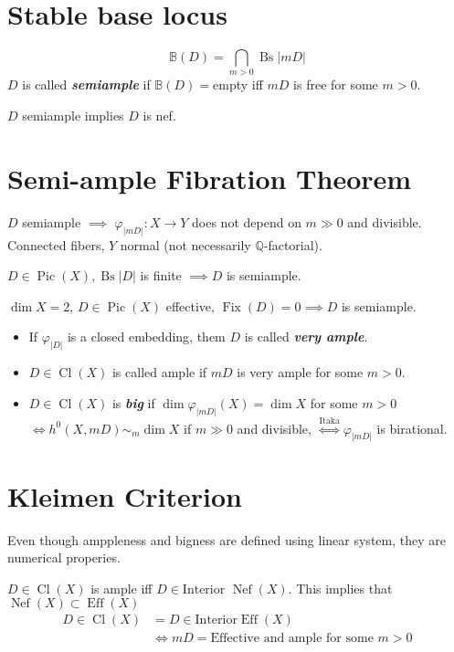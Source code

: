  \section{Stable base locus}
 \[\mathbb{B}(D)=\bigcap_{m>0}\operatorname{Bs}|mD|\]
 $D$ is called \textit{\textbf{semiample}} if  $\mathbb{B}(D)=$empty iff $mD$ is free for some $m>0$.

  $D$ semiample implies $D$ is nef.

 \section{Semi-ample Fibration Theorem}

 \begin{thm}
 	$D$ semiample $\implies $ $\varphi_{|mD|}:X\to Y$ does not depend on $m\gg 0$ and divisible. Connected fibers,  $Y$ normal (not necessarily $\mathbb{Q}$-factorial).
 \end{thm}

 \begin{thm}[Zariski]\leavevmode
 	$D\in\operatorname{Pic}(X), \operatorname{Bs}|D|$ is finite $\implies $$D$ is semiample.
 \end{thm}

\begin{coro}
	$\dim X=2$, $D\in\operatorname{Pic}(X)$ effective, $\operatorname{Fix}(D)=0\implies D$ is semiample.
\end{coro}

\begin{itemize}
\item If $\varphi_{|D|}$ is a closed embedding, them $D$ is called \textit{\textbf{very ample}}.
\item $D\in\operatorname{Cl}(X)$ is called ample if $mD$ is very ample for some $m>0$.
\item $D\in\operatorname{Cl}(X)$ is \textit{\textbf{big}} if  $\dim \varphi_{|mD|}(X)=\dim X$ for some $m>0$  $\iff h^0(X,mD)\sim_m\dim X$ if $m\gg 0$ and divisible, $ \overset{\text{Itaka} }{\iff}\varphi_{|mD|}$ is birational. 
\end{itemize} 

\section{Kleimen Criterion}
Even though amppleness and bigness are defined using linear system, they are numerical properies.

\begin{thm}\leavevmode
	$D \in\operatorname{Cl}(X)$ is ample iff $D\in \text{Interior }\operatorname{Nef}(X)$. This implies that $\operatorname{Nef}(X)\subset \operatorname{Eff}(X)$
	\begin{align*}
		D\in\operatorname{Cl}(X)&=D\in\text{Interior} \operatorname{E f f}(X)\\
		&\iff mD=\text{Effective and ample for some } m>0
	\end{align*}
\end{thm}

